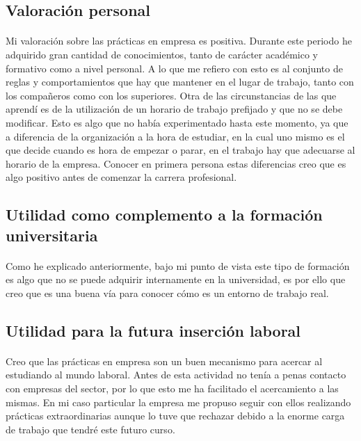 \documentclass[11pt, a4paper,spanish]{article}
\begin{document}
        \subsection{Valoración personal}
			\paragraph{}
			Mi valoración sobre las prácticas en empresa es positiva. Durante este periodo he adquirido gran cantidad de conocimientos, tanto de carácter académico y formativo como a nivel personal. A lo que me refiero con esto es al conjunto de reglas y comportamientos que hay que mantener en el lugar de trabajo, tanto con los compañeros como con los superiores. Otra de las circunstancias de las que aprendí es de la utilización de un horario de trabajo prefijado y que no se debe modificar. Esto es algo que no había experimentado hasta este momento, ya que a diferencia de la organización a la hora de estudiar, en la cual uno mismo es el que decide cuando es hora de empezar o parar, en el trabajo hay que adecuarse al horario de la empresa. Conocer en primera persona estas diferencias creo que es algo positivo antes de comenzar la carrera profesional.


        \subsection{Utilidad como complemento a la formación universitaria}
			\paragraph{}
			Como  he explicado anteriormente, bajo mi punto de vista este tipo de formación es algo que no se puede adquirir internamente en la universidad, es por ello que creo que es una buena vía para conocer cómo es un entorno de trabajo real.

        \subsection{Utilidad para la futura inserción laboral}
			\paragraph{}
			Creo que las prácticas en empresa son un buen mecanismo para acercar al estudiando al mundo laboral. Antes de esta actividad no tenía a penas contacto con empresas del sector, por lo que esto me ha facilitado el acercamiento a las mismas. En mi caso particular la empresa me propuso seguir con ellos realizando prácticas extraordinarias aunque lo tuve que rechazar debido a la enorme carga de trabajo que tendré este futuro curso.
\end{document}

